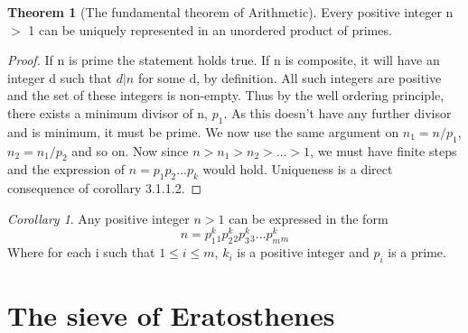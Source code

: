 \documentclass[15,a4paper]{report}
\theoremstyle{definition}
\newtheorem{theorem}{Theorem}[section]
\theoremstyle{remark}
\newtheorem{corollary}{Corollary}[theorem]
\begin{document}
\begin{theorem}[The fundamental theorem of Arithmetic]
    Every positive integer n $>$ 1 can be uniquely represented in an unordered product of primes.
\end{theorem}
\begin{proof}
    If n is prime the statement holds true. If n is composite, it will have an integer d such that $d|n$ for some d, by definition. All such integers are positive and the set of these integers is non-empty. Thus by the well ordering principle, there exists a minimum divisor of n, $p_1$. As this doesn't have any further divisor and is minimum, it must be prime. We now use the same argument on $n_1 = n/p_1$, $n_2=n_1/p_2$ and so on. Now since $n>n_1>n_2> \dots >1$, we must have finite steps and the expression of $n=p_1p_2\dots p_k$ would hold. Uniqueness is a direct consequence of corollary 3.1.1.2.
\end{proof}
\begin{corollary}
    Any positive integer $n>1$ can be expressed in the form \[
    n=p_1^k_1 p_2^k_2 p_3^k_3 \dots p_m ^k_m \]
    Where for each i such that $1 \leq i \leq m$, $k_i$ is a positive integer and $p_i$ is a prime.
\end{corollary}

\section{The sieve of Eratosthenes}
\end{document}
